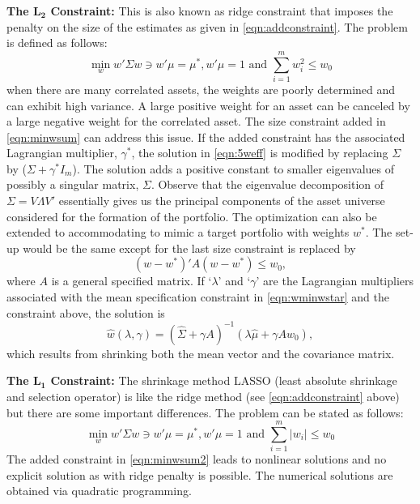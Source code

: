 \noindent\textbf{The $\mathbf{L_2}$ Constraint:} This is also known as ridge constraint that imposes the penalty on the size of the estimates as given in \eqref{eqn:addconstraint}. The problem is defined as follows:
	\begin{equation} \label{eqn:minwsum}
	\min_w w' \Sigma w \ni w' \mu= \mu^*, w'\mu= 1 \text{ and }\sum_{i=1}^m w_i^2 \leq w_0
	\end{equation}
when there are many correlated assets, the weights are poorly determined and can exhibit high variance. A large positive weight for an asset can be canceled by a large negative weight for the correlated asset. The size constraint added in \eqref{eqn:minwsum} can address this issue. If the added constraint has the associated Lagrangian multiplier, $\gamma^*$, the solution in \eqref{eqn:5weff} is modified by replacing $\Sigma$ by ($\Sigma + \gamma^* I_m$). The solution adds a positive constant to smaller eigenvalues of possibly a singular matrix, $\Sigma$. Observe that the eigenvalue decomposition of $\Sigma= V \Lambda V'$ essentially gives us the principal components of the asset universe considered for the formation of the portfolio. The optimization can also be extended to accommodating to mimic a target portfolio with weights $w^*$. The set-up would be the same except for the last size constraint is replaced by
	\begin{equation} \label{eqn:wminwstar}
	(w - w^*)' A(w - w^*) \leq w_0,
	\end{equation}
where $A$ is a general specified matrix. If `$\lambda$' and `$\gamma$' are the Lagrangian multipliers associated with the mean specification constraint in \eqref{eqn:wminwstar} and the constraint above, the solution is
	\begin{equation} \label{eqn:hatwlambdagamma}
	\hat{w}(\lambda,\gamma)= (\hat{\Sigma} + \gamma A)^{-1} (\lambda \hat{\mu} + \gamma A w_0),
	\end{equation}
which results from shrinking both the mean vector and the covariance matrix. \twomedskip


\noindent\textbf{The $\mathbf{L_1}$ Constraint:} The shrinkage method LASSO (least absolute shrinkage and selection operator) is like the ridge method (see \eqref{eqn:addconstraint} above) but there are some important differences. The problem can be stated as follows:
	\begin{equation} \label{eqn:minwsum2}
	\min_w w' \Sigma w \ni w'\mu=\mu^*, w'\mu=1 \text{ and } \sum_{i=1}^m |w_i| \leq w_0
	\end{equation}
The added constraint in \eqref{eqn:minwsum2} leads to nonlinear solutions and no explicit solution as with ridge penalty is possible. The numerical solutions are obtained via quadratic programming.


